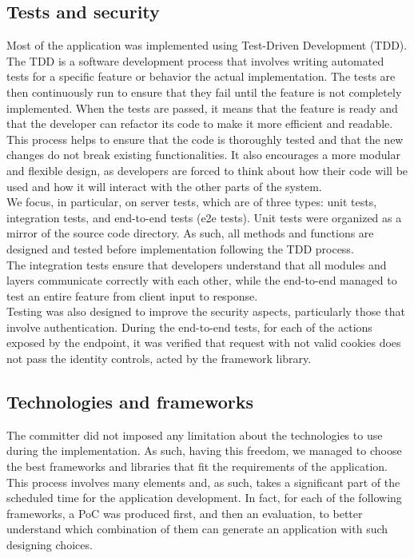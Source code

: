\subsection{Tests and security}
Most of the application was implemented using Test-Driven Development (TDD). The TDD is a software development process that involves writing automated tests for a specific feature or behavior the actual implementation. The tests are then continuously run to ensure that they fail until the feature is not completely implemented. When the tests are passed, it means that the feature is ready and that the developer can refactor its code to make it more efficient and readable. This process helps to ensure that the code is thoroughly tested and that the new changes do not break existing functionalities. It also encourages a more modular and flexible design, as developers are forced to think about how their code will be used and how it will interact with the other parts of the system.
\\ We focus, in particular, on server tests, which are of three types: unit tests, integration tests, and end-to-end tests (e2e tests). Unit tests were organized as a mirror of the source code directory. As such, all methods and functions are designed and tested before implementation following the TDD process. 
\\ The integration tests ensure that developers understand that all modules and layers communicate correctly with each other, while the end-to-end managed to test an entire feature from client input to response. 
\\ Testing was also designed to improve the security aspects, particularly those that involve authentication. During the end-to-end tests, for each of the actions exposed by the endpoint, it was verified that request with not valid cookies does not pass the identity controls, acted by the framework library. 

\subsection{Technologies and frameworks}
The committer did not imposed any limitation about the technologies to use during the implementation. As such, having this freedom, we managed to choose the best frameworks and libraries that fit the requirements of the application. This process involves many elements and, as such, takes a significant part of the scheduled time for the application development. In fact, for each of the following frameworks, a PoC was produced first, and then an evaluation, to better understand which combination of them can generate an application with such designing choices. 

